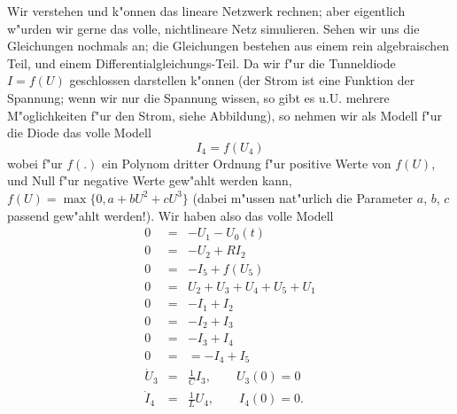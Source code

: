 {%

Wir verstehen und k"onnen das lineare Netzwerk rechnen; aber eigentlich w"urden wir gerne das volle, nichtlineare
Netz simulieren. Sehen wir uns die Gleichungen nochmals an; die Gleichungen  bestehen aus einem rein 
algebraischen Teil, und einem Differentialgleichungs-Teil. Da wir f"ur die Tunneldiode 
$I=f(U)$ geschlossen darstellen k"onnen (der Strom ist eine Funktion der Spannung; wenn wir nur die Spannung wissen,
so gibt es u.U. mehrere M"oglichkeiten f"ur den Strom, siehe Abbildung), so nehmen wir als Modell f"ur die Diode
das volle Modell
$$ I_4 = f(U_4)$$
wobei f"ur $f(.)$ ein Polynom dritter Ordnung f"ur positive Werte von $f(U)$, und Null f"ur negative Werte 
gew"ahlt werden kann, $f(U) = \max\{0, a+bU^2 + cU^3\}$ (dabei m"ussen nat"urlich die Parameter $a$, $b$, $c$ passend gew"ahlt werden!).
Wir haben also das volle Modell
\begin{eqnarray*}
0 & = & - U_1- U_0(t)\\
0   & = & -U_2 +R I_2\\
0 & = &-I_5+ f(U_5)\\
0 & = & U_2+U_3+U_4+ U_5  + U_1\\
0 & = & -I_1 +I_2\\
0 & = & -I_2+I_3\\
0 & = &  -I_3+I_4\\
0 & = &  = -I_4+I_5\\
\dot U_3 & = & \frac 1 C I_3,\qquad U_3(0) = 0\\
 \dot I_4 & = & \frac 1 L U_4,\qquad I_4(0) = 0. 
\end{eqnarray*}

}
